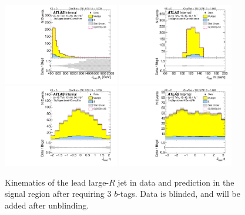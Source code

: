 \clearpage

\begin{figure}[htbp!]
\begin{center}
\includegraphics[width=0.45\textwidth,angle=-90]{figures/boosted/Signal/b77_ThreeTag_Signal_leadHCand_Pt_m_blind.pdf}
\includegraphics[width=0.45\textwidth,angle=-90]{figures/boosted/Signal/b77_ThreeTag_Signal_leadHCand_Mass_s_blind.pdf}\\
\includegraphics[width=0.45\textwidth,angle=-90]{figures/boosted/Signal/b77_ThreeTag_Signal_leadHCand_Eta_blind.pdf}
\includegraphics[width=0.45\textwidth,angle=-90]{figures/boosted/Signal/b77_ThreeTag_Signal_leadHCand_Phi_blind.pdf}
  \caption{Kinematics of the lead large-$R$ jet in data and prediction in the signal region after requiring 3 $b$-tags. Data is blinded, and will be added after unblinding.}
  \label{fig:boosted-3b-signal-blind-ak10-lead}
\end{center}
\end{figure}

